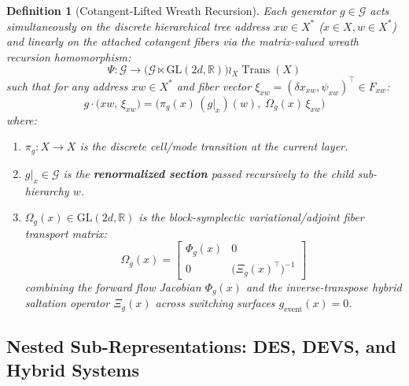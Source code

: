 \documentclass[journal]{IEEEtran}
\newtheorem{definition}{Definition}
\begin{document}
\begin{definition}[Cotangent-Lifted Wreath Recursion]
Each generator $g \in \mathcal{G}$ acts simultaneously on the discrete hierarchical tree address $xw \in X^*$ ($x \in X, w \in X^*$) and linearly on the attached cotangent fibers via the matrix-valued wreath recursion homomorphism:
\begin{equation}
\Psi : \mathcal{G} \longrightarrow \big(\mathcal{G} \ltimes \mathrm{GL}(2d, \mathbb{R})\big) \wr_{X} \operatorname{Trans}(X)
\end{equation}
such that for any address $xw \in X^*$ and fiber vector $\xi_{xw} = (\delta x_{xw}, \psi_{xw})^\top \in F_{xw}$:
\begin{equation}
g \cdot \big(xw,\, \xi_{xw}\big) = \Big( \pi_g(x)\,(g|_x)(w),\; \Omega_g(x)\, \xi_{xw} \Big)
\end{equation}
where:
\begin{enumerate}
    \item $\pi_g : X \to X$ is the discrete cell/mode transition at the current layer.
    \item $g|_x \in \mathcal{G}$ is the \textbf{renormalized section} passed recursively to the child sub-hierarchy $w$.
    \item $\Omega_g(x) \in \mathrm{GL}(2d, \mathbb{R})$ is the block-symplectic variational/adjoint fiber transport matrix:
    \begin{equation}
    \Omega_g(x) =
    \begin{bmatrix}
    \Phi_g(x) & 0 \\
    0 & \big(\Xi_g(x)^\top\big)^{-1}
    \end{bmatrix}
    \end{equation}
    combining the forward flow Jacobian $\Phi_g(x)$ and the inverse-transpose hybrid saltation operator $\Xi_g(x)$ across switching surfaces $g_{\text{event}}(x) = 0$.
\end{enumerate}
\end{definition}

\subsection{Nested Sub-Representations: DES, DEVS, and Hybrid Systems}
\end{document}
